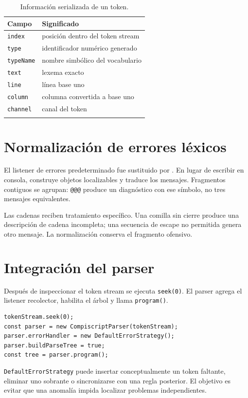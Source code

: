 \documentclass[11pt,letterpaper,oneside]{report}
\newcommand{\archivo}[1]{\path{#1}}
\newcommand{\codigo}[1]{\texttt{#1}}
\begin{document}
\begin{longtable}{p{}p{}}
\toprule
Campo & Significado \\
\midrule
\endhead
\codigo{index} & posición dentro del token stream \\
\codigo{type} & identificador numérico generado \\
\codigo{typeName} & nombre simbólico del vocabulario \\
\codigo{text} & lexema exacto \\
\codigo{line} & línea base uno \\
\codigo{column} & columna convertida a base uno \\
\codigo{channel} & canal del token \\
\bottomrule
\caption{Información serializada de un token.}
\end{longtable}

\section{Normalización de errores léxicos}

El listener de errores predeterminado fue sustituido por
\archivo{CollectingErrorListener}. En
lugar de escribir en consola, construye objetos localizables y traduce los mensajes.
Fragmentos contiguos se agrupan: \codigo{@@@} produce un diagnóstico con ese símbolo,
no tres mensajes equivalentes.

Las cadenas reciben tratamiento específico. Una comilla sin cierre produce una
descripción de cadena incompleta; una secuencia de escape no permitida genera otro
mensaje. La normalización conserva el fragmento ofensivo.

\section{Integración del parser}

Después de inspeccionar el token stream se ejecuta \codigo{seek(0)}. El parser agrega
el listener recolector, habilita el árbol y llama \codigo{program()}.

\begin{verbatim}
tokenStream.seek(0);
const parser = new CompiscriptParser(tokenStream);
parser.errorHandler = new DefaultErrorStrategy();
parser.buildParseTree = true;
const tree = parser.program();
\end{verbatim}

\codigo{DefaultErrorStrategy} puede insertar conceptualmente un token faltante,
eliminar uno sobrante o sincronizarse con una regla posterior. El objetivo es evitar
que una anomalía impida localizar problemas independientes.
\end{document}
